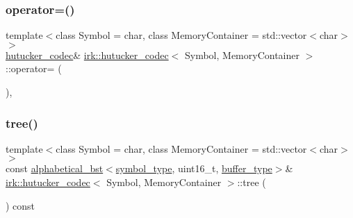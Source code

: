 \mbox{\label{classirk_1_1hutucker__codec_a7d7253db1a48617db0176effd4f3fe0c}} 
\subsubsection{\texorpdfstring{operator=()}{operator=()}\hspace{0.1cm}{\footnotesize\ttfamily [2/2]}}
{\footnotesize\ttfamily template$<$class Symbol = char, class Memory\+Container = std\+::vector$<$char$>$$>$ \\
\mbox{\hyperlink{classirk_1_1hutucker__codec}{hutucker\+\_\+codec}}\& \mbox{\hyperlink{classirk_1_1hutucker__codec}{irk\+::hutucker\+\_\+codec}}$<$ Symbol, Memory\+Container $>$\+::operator= (\begin{DoxyParamCaption}\item[{\mbox{\hyperlink{classirk_1_1hutucker__codec}{hutucker\+\_\+codec}}$<$ Symbol, Memory\+Container $>$ \&\&}]{ }\end{DoxyParamCaption})\hspace{0.3cm}{\ttfamily [delete]}, {\ttfamily [noexcept]}}

\mbox{\label{classirk_1_1hutucker__codec_a68886f66b539effd689bd54ccf591db1}} 
\subsubsection{\texorpdfstring{tree()}{tree()}}
{\footnotesize\ttfamily template$<$class Symbol = char, class Memory\+Container = std\+::vector$<$char$>$$>$ \\
const \mbox{\hyperlink{classirk_1_1alphabetical__bst}{alphabetical\+\_\+bst}}$<$\mbox{\hyperlink{classirk_1_1hutucker__codec_af23dee5959ae2a69eea0ab324cf6ecb6}{symbol\+\_\+type}}, uint16\+\_\+t, \mbox{\hyperlink{classirk_1_1hutucker__codec_a995378c8c253dae9867a4b1762eeaf95}{buffer\+\_\+type}}$>$\& \mbox{\hyperlink{classirk_1_1hutucker__codec}{irk\+::hutucker\+\_\+codec}}$<$ Symbol, Memory\+Container $>$\+::tree (\begin{DoxyParamCaption}{ }\end{DoxyParamCaption}) const\hspace{0.3cm}{\ttfamily [inline]}}



